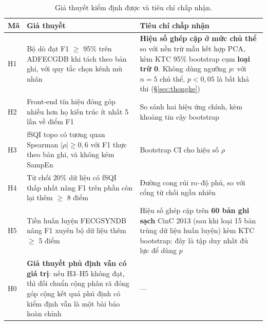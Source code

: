 \begin{table}[H]\centering\small
\caption{Giả thuyết kiểm định được và tiêu chí chấp nhận.}
\label{tab:h}
\begin{tabular}{@{}C{1.1cm} L{9.0cm} L{4.2cm}@{}}
\toprule
\textbf{Mã} & \textbf{Giả thuyết} & \textbf{Tiêu chí chấp nhận} \\
\midrule
H1 & Bộ dò \hethong{} đạt F1 $\geq$ 95\% trên ADFECGDB khi tách theo bản ghi, với quy tắc chọn kênh
mù nhãn & \textbf{Hiệu số ghép cặp ở mức chủ thể} so với nền trừ mẫu kết hợp PCA, kèm KTC 95\% bootstrap
cụm \textbf{loại trừ 0}. Không dùng ngưỡng $p$: với $n = 5$ chủ thể, $p < 0{,}05$ là bất khả thi
(\S\ref{sec:thongke}) \\
H2 & Front-end tín hiệu đóng góp nhiều hơn họ kiến trúc ít nhất 5 lần về điểm F1 & So sánh hai hiệu ứng
chính, kèm khoảng tin cậy bootstrap \\
H3 & fSQI topo có tương quan Spearman $|\rho| \geq 0{,}6$ với F1 thực theo bản ghi, và không kém
SampEn & Bootstrap CI cho hiệu số $\rho$ \\
H4 & Từ chối 20\% dữ liệu có fSQI thấp nhất nâng F1 trên phần còn lại thêm $\geq$ 8 điểm & Đường cong
rủi ro--độ phủ, so với cổng từ chối ngẫu nhiên \\
H5 & Tiền huấn luyện FECGSYNDB nâng F1 xuyên bộ dữ liệu thêm $\geq$ 5 điểm & Hiệu số ghép cặp trên
\textbf{60 bản ghi sạch} CinC 2013 (sau khi loại 15 bản trùng dữ liệu huấn luyện) kèm KTC
bootstrap; đây là tập duy nhất đủ lực để dùng $p$ \\
H0 & \textbf{Giả thuyết phủ định vẫn có giá trị}: nếu H3--H5 không đạt, thì đối chuẩn cộng phân rã
đóng góp cộng kết quả phủ định có kiểm định vẫn là một bài báo hoàn chỉnh & --- \\
\bottomrule
\end{tabular}
\end{table}

\clearpage
